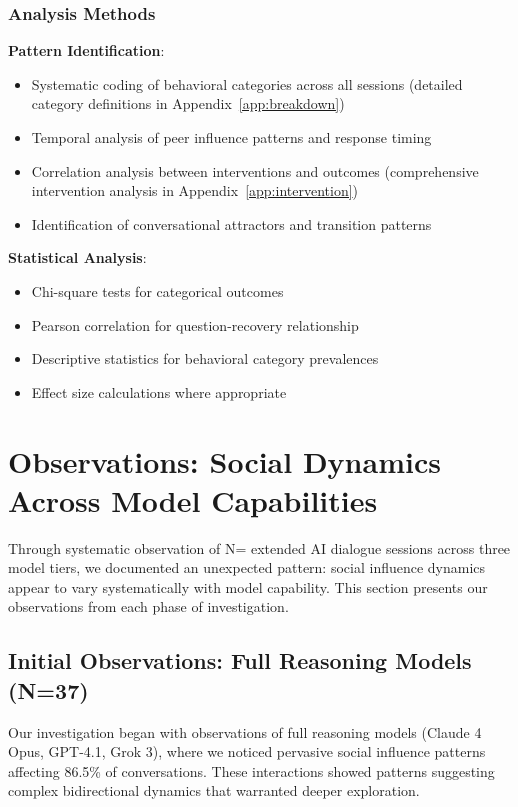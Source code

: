 \documentclass[11pt,letterpaper]{article}
\newcommand{\exponedataTotalSessionsRaw}{37}
\newcommand{\exponedataTotalSessions}{N=\exponedataTotalSessionsRaw}
\newcommand{\exponedataPeerPressurePercentage}{86.5\%}
\newcommand{\exptwoTotalSessionsRaw}{31}
\newcommand{\expthreeTotalSessionsRaw}{30}
\newcommand{\totalAllPhasesRaw}{\fpeval{\exponedataTotalSessionsRaw + \exptwoTotalSessionsRaw + \expthreeTotalSessionsRaw}}
\newcommand{\totalAllPhases}{N=\totalAllPhasesRaw}
\begin{document}
\subsubsection{Analysis Methods}

\textbf{Pattern Identification}:
\begin{itemize}
    \item Systematic coding of behavioral categories across all sessions (detailed category definitions in Appendix~\ref{app:breakdown})
    \item Temporal analysis of peer influence patterns and response timing
    \item Correlation analysis between interventions and outcomes (comprehensive intervention analysis in Appendix~\ref{app:intervention})
    \item Identification of conversational attractors and transition patterns
\end{itemize}

\textbf{Statistical Analysis}:
\begin{itemize}
    \item Chi-square tests for categorical outcomes
    \item Pearson correlation for question-recovery relationship
    \item Descriptive statistics for behavioral category prevalences
    \item Effect size calculations where appropriate
\end{itemize}

\section{Observations: Social Dynamics Across Model Capabilities}

Through systematic observation of \totalAllPhases{} extended AI dialogue sessions across three model tiers, we documented an unexpected pattern: social influence dynamics appear to vary systematically with model capability. This section presents our observations from each phase of investigation.

\subsection{Initial Observations: Full Reasoning Models (\exponedataTotalSessions{})}

Our investigation began with observations of full reasoning models (Claude 4 Opus, GPT-4.1, Grok 3), where we noticed pervasive social influence patterns affecting \exponedataPeerPressurePercentage{} of conversations. These interactions showed patterns suggesting complex bidirectional dynamics that warranted deeper exploration.
\end{document}
